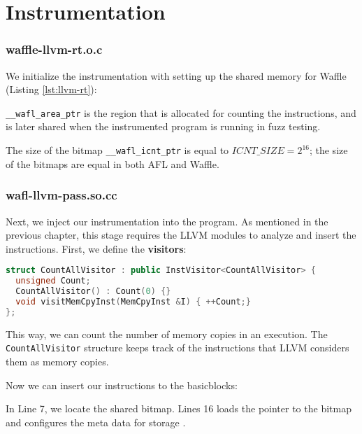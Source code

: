 \section{Instrumentation}
\label{sec:3-instr}

\subsubsection*{waffle-llvm-rt.o.c}

We initialize the instrumentation with setting up the shared memory for Waffle (Listing \ref{lst:llvm-rt}):



\texttt{\_\_wafl\_area\_ptr} is the region that is allocated for counting the instructions, and is later shared when the instrumented program is running in fuzz testing.

The size of the bitmap \texttt{\_\_wafl\_icnt\_ptr} is equal to $ICNT\_SIZE=2^{16}$; the size of the bitmaps are equal in both AFL and Waffle.

\subsubsection*{wafl-llvm-pass.so.cc}

Next, we inject our instrumentation into the program. As mentioned in the previous chapter, this stage requires the LLVM modules to analyze and insert the instructions. First, we define the \textbf{visitors}:

\begin{lstlisting}[language=C++,style=CodeStyle,label={lst:wfl-vis}]
struct CountAllVisitor : public InstVisitor<CountAllVisitor> {
  unsigned Count;
  CountAllVisitor() : Count(0) {}
  void visitMemCpyInst(MemCpyInst &I) { ++Count;}
};
\end{lstlisting}

This way, we can count the number of memory copies in an execution. The \texttt{CountAll\-Visitor} structure keeps track of the instructions that LLVM considers them as memory copies.

Now we can insert our instructions to the basicblocks:



In Line 7, we locate the shared bitmap. Lines 16 loads the pointer to the bitmap and configures the meta data for storage \cite{nosanitize}.

